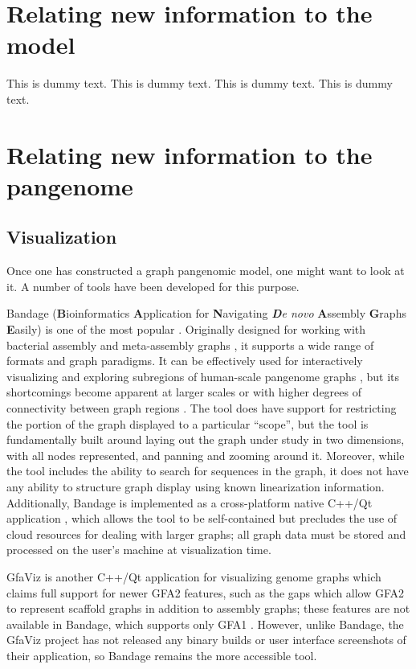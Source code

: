 \section{Relating new information to the model}
This is dummy text. This is dummy text. This is dummy text. This is dummy text. 

\section{Relating new information to the pangenome}

\subsection{Visualization}

Once one has constructed a graph pangenomic model, one might want to look at it.
A number of tools have been developed for this purpose.

Bandage (\textbf{B}ioinformatics \textbf{A}pplication for \textbf{N}avigating \textit{\textbf{D}e novo} \textbf{A}ssembly \textbf{G}raphs \textbf{E}asily) \citep{Wick_2015} is one of the most popular \citep{Mikheenko_2019}.
Originally designed for working with bacterial assembly and meta-assembly graphs \citep{Wick_2015}, it supports a wide range of formats and graph  paradigms.
It can be effectively used for interactively visualizing and exploring subregions of human-scale pangenome graphs \citep{Garrison_2019}, but its shortcomings become apparent at larger scales or with higher degrees of connectivity between graph regions \citep{Mikheenko_2019}.
The tool does have support for restricting the portion of the graph displayed to a particular ``scope'', but the tool is fundamentally built around laying out the graph under study in two dimensions, with all nodes represented, and panning and zooming around it.
Moreover, while the tool includes the ability to search for sequences in the graph, it does not have any ability to structure graph display using known linearization information.
Additionally, Bandage is implemented as a cross-platform native C++/Qt application \citep{Wick_2015}, which allows the tool to be self-contained but precludes the use of cloud resources for dealing with larger graphs; all graph data must be stored and processed on the user's machine at visualization time.

GfaViz is another C++/Qt application for visualizing genome graphs which claims full support for newer GFA2 features, such as the gaps which allow GFA2 to represent scaffold graphs in addition to assembly graphs; these features are not available in Bandage, which supports only GFA1 \citep{Gonnella_2018}.
However, unlike Bandage, the GfaViz project has not released any binary builds or user interface screenshots of their application, so Bandage remains the more accessible tool.

